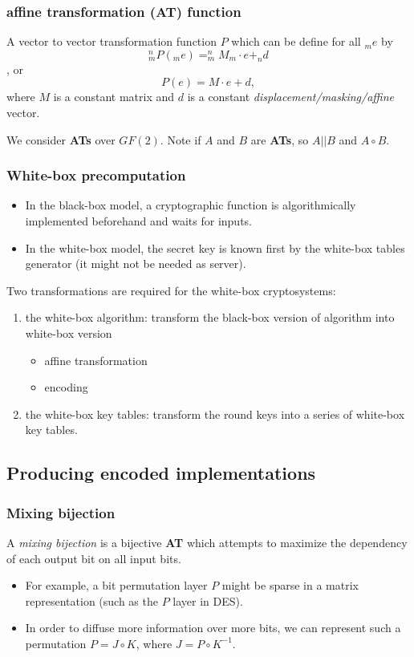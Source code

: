 \documentclass{beamer}
\begin{document}
\frame
{
\frametitle{affine transformation (\textbf{AT}) function}
A vector to vector transformation function $P$ which can be define for all $_{m}e$ by \[^{n}_{m}P(_{m}e)= ^{n}_{m}M_{m}\cdot e + _{n}d\], or \[P(e)=M\cdot e + d,\]
where $M$ is a constant matrix and $d$ is a constant \textit{displacement/masking/affine} vector.

We consider \textbf{ATs} over $GF(2)$. Note if $A$ and $B$ are \textbf{ATs}, so $A||B$ and $A \circ B$.
}

\frame
{
\frametitle{White-box precomputation}
\begin{itemize}
\item In the black-box model, a cryptographic function is algorithmically implemented beforehand and waits for inputs.

\item In the white-box model, the secret key is known first by the white-box tables generator (it might not be needed as server).
\end{itemize}

Two transformations are required for the white-box cryptosystems:
\begin{enumerate}
\item the white-box algorithm: transform the black-box version of algorithm into white-box version
\begin{itemize}
\item affine transformation
\item encoding
\end{itemize}
\item the white-box key tables: transform the round keys into a series of white-box key tables.
\end{enumerate}
}

\subsection{Producing encoded implementations}

\frame
{
\frametitle{Mixing bijection}
A \textit{mixing bijection} is a bijective \textbf{AT} which attempts to maximize the dependency of each output bit on all input bits.

\begin{itemize}
\item For example, a bit permutation layer $P$ might be sparse in a matrix representation (such as the $P$ layer in DES).

\item In order to diffuse more information over more bits, we can represent such a permutation $P=J \circ K$, where $J = P \circ K^{-1}$.
\end{itemize}
}
\end{document}

